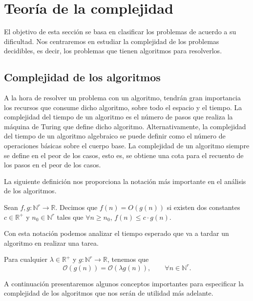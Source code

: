 \section{Teoría de la complejidad}

El objetivo de esta sección se basa en clasificar los problemas de acuerdo a su dificultad. Nos centraremos en estudiar la complejidad de los problemas decidibles, es decir, los problemas que tienen algoritmos para resolverlos.

\subsection{Complejidad de los algoritmos}

A la hora de resolver un problema con un algoritmo, tendrán gran importancia los recursos que consume dicho algoritmo, sobre todo el espacio y el tiempo. La complejidad del tiempo de un algoritmo es el número de pasos que realiza la máquina de Turing que define dicho algoritmo. Alternativamente, la complejidad del tiempo de un algoritmo algebraico se puede definir como el número de operaciones básicas sobre el cuerpo base. La complejidad de un algoritmo siempre se define en el peor de los casos, esto es, se obtiene una cota para el recuento de los pasos en el peor de los casos. 

La siguiente definición nos proporciona la notación más importante en el análisis de los algoritmos.

\begin{definition}
    Sean $f, g : \mathbb{N}^r \longrightarrow \mathbb{R}$. Decimos que $f(n) = O(g(n))$ si existen dos constantes $c \in \mathbb{R}^+$ y $n_0 \in \mathbb{N}^r$ tales que $\forall n \geq n_0$, $f(n) \leq c \cdot g(n)$.
\end{definition}

Con esta notación podemos analizar el tiempo esperado que va a tardar un algoritmo en realizar una tarea.

\begin{proposition}
    Para cualquier $\lambda \in \mathbb{R}^+$ y $g : \mathbb{N}^r \longrightarrow \mathbb{R}$, tenemos que
    \[
        \mathcal{O}(g(n)) = \mathcal{O}(\lambda g(n)), \qquad \forall n \in \mathbb{N}^r.
    \]
\end{proposition}

A continuación presentaremos algunos conceptos importantes para especificar la complejidad de los algoritmos que nos serán de utilidad más adelante.

